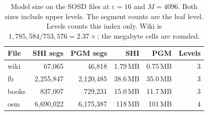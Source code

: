 \documentclass[conference]{IEEEtran}
\begin{document}
\begin{table}[t]
\caption{Model size on the SOSD files at $\varepsilon=16$ and $M=4096$.
Both sizes include upper levels.
The segment counts are the leaf level.
Levels counts this index only.
Wiki is $1{,}785{,}584/753{,}576=2.37\times$; the megabyte cells are rounded.}
\label{tab:space}
\centering
\footnotesize
\begin{tabular}{@{}lrrrrr@{}}
\toprule
File & SHI segs & PGM segs & SHI & PGM & Levels \\
\midrule
wiki  & 67{,}065 & 46{,}818 & 1.79\,MB & 0.75\,MB & 3 \\
fb    & 2{,}255{,}847 & 2{,}120{,}485 & 38.6\,MB & 35.0\,MB & 3 \\
books & 837{,}007 & 729{,}231 & 15.0\,MB & 11.7\,MB & 3 \\
osm   & 6{,}690{,}022 & 6{,}175{,}387 & 118\,MB & 101\,MB & 4 \\
\bottomrule
\end{tabular}
\end{table}
\end{document}

